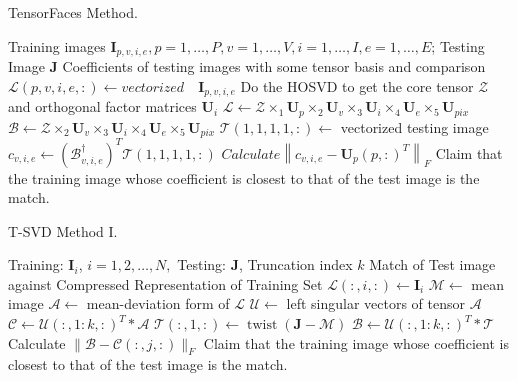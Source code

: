 \documentclass[english]{article}
\newcommand{\<}{\langle}
\renewcommand{\>}{\rangle}
\theoremstyle{definition}
\begin{document}
\begin{algorithm}  
	\caption{TensorFaces Method.}
	\begin{algorithmic} 
		\Require  
		Training images $ \mathbf{I}_{p, v, i, e}, p=1, \ldots, P, v=1, \ldots, V, i=1, \ldots, I, e=1, \ldots, E $;
		Testing Image $ \mathbf{J} $
		\Ensure  
		Coefficients of testing images with some tensor basis and comparison  
		\State $ \mathcal{L}(p, v, i, e, :) \leftarrow  vectorized \quad \mathbf{I}_{p, v,i,e} $
		\EndFor
		\State Do the HOSVD to get the core tensor $ \mathcal{Z} $ and orthogonal factor matrices  $\mathbf{U}_{i}$
		\State $\mathcal{L} \leftarrow \mathcal{Z} \times_{1} \mathbf{U}_{p} \times_{2} \mathbf{U}_{v} \times_{3} \mathbf{U}_{i} \times_{4} \mathbf{U}_{e} \times_{5} \mathbf{U}_{p i x}$
		\State $ \mathcal{B} \leftarrow \mathcal{Z} \times_{2} \mathbf{U}_{v} \times_{3} \mathbf{U}_{i} \times_{4} \mathbf{U}_{e} \times_{5} \mathbf{U}_{p i x}  $
		\State $ \mathcal{T}(1,1,1,1,:) \leftarrow  $ vectorized testing image
		\State $ c_{v, i, e} \leftarrow\left(\mathcal{B}_{v, i, e}^{\dagger}\right)^{T} \mathcal{T}(1,1,1,1,:) $
		\State $Calculate  \left\|c_{v, i, e}-\mathbf{U}_{p}(p,:)^{T}\right\|_{F}$
		\EndFor
		\EndFor
		\State Claim that the training image whose coefficient is closest to that of the test image is the match. 
	\end{algorithmic}
\end{algorithm}

\begin{algorithm}  
	\caption{T-SVD Method I.}
	\begin{algorithmic} 
		\Require  
		Training:  $\mathbf{I}_{i}$, $i=1,2, \ldots, N, $ Testing: $ \mathbf{J}$,  Truncation index $ k $
		\Ensure  
		Match of Test image against Compressed Representation of Training Set  
		\For  {$i=1 \quad to \quad N $}
		\State  $\mathcal{L}(:, i,:) \leftarrow \mathbf{I}_{i}$
		\EndFor
		\State $ \mathcal{M} \leftarrow $ mean image
		\State $ \mathcal{A} \leftarrow $ mean-deviation form of $ \mathcal{L}  $
		\State $ \mathcal{U} \leftarrow $ left singular vectors of tensor $ \mathcal{A} $
		\State $ \mathcal{C} \leftarrow \mathcal{U}(:, 1: k,:)^{T} * \mathcal{A} $
		\State $ \mathcal{T}(:, 1,:) \leftarrow \operatorname{twist}(\mathbf{J}-\mathcal{M})  $
		\State $ \mathcal{B} \leftarrow \mathcal{U}(:, 1: k,:)^{T} * \mathcal{T} $
		\For  {$j=1 \quad to \quad N $}
		\State Calculate $ \|\mathcal{B}-\mathcal{C}(:, j,:)\|_{F} $
		\EndFor
		\State Claim that the training image whose coefficient is closest to that of the test image is the match. 
	\end{algorithmic}
\end{algorithm}
\end{document}
